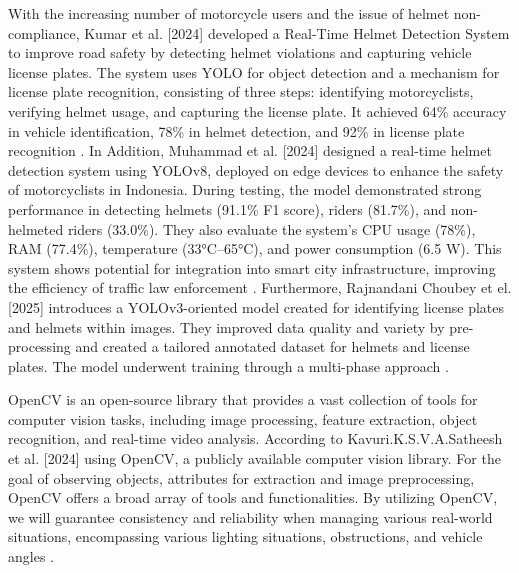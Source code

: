 \begin{refsection}
    With the increasing number of motorcycle users and the issue of helmet non-compliance, Kumar et al. [2024] developed a Real-Time Helmet Detection System to improve road safety by detecting helmet violations and capturing vehicle license plates. The system uses YOLO for object detection and a mechanism for license plate recognition, consisting of three steps: identifying motorcyclists, verifying helmet usage, and capturing the license plate. It achieved 64\% accuracy in vehicle identification, 78\% in helmet detection, and 92\% in license plate recognition \cite{kumar2024realtime}. In Addition, Muhammad et al. [2024] designed a real-time helmet detection system using YOLOv8, deployed on edge devices to enhance the safety of motorcyclists in Indonesia. During testing, the model demonstrated strong performance in detecting helmets (91.1\% F1 score), riders (81.7\%), and non-helmeted riders (33.0\%). They also evaluate the system’s CPU usage (78\%), RAM (77.4\%), temperature (33°C–65°C), and power consumption (6.5 W). This system shows potential for integration into smart city infrastructure, improving the efficiency of traffic law enforcement \cite {muhammad2024helmet}. Furthermore, Rajnandani Choubey et el. [2025] introduces a YOLOv3-oriented model created for identifying license plates and helmets within images. They improved data quality and variety by pre-processing and created a tailored annotated dataset for helmets and license plates. The model underwent training through a multi-phase approach \cite{choubey2025helmet}.

    OpenCV is an open-source library that provides a vast collection of tools for computer vision tasks, including image processing, feature extraction, object recognition, and real-time video analysis. According to Kavuri.K.S.V.A.Satheesh et al. [2024] using OpenCV, a publicly available computer vision library. For the goal of observing objects, attributes for extraction and image preprocessing, OpenCV offers a broad array of tools and functionalities. By utilizing OpenCV, we will guarantee consistency and reliability when managing various real-world situations, encompassing various lighting situations, obstructions, and vehicle angles \cite{satheesh2024automated}.


\end{refsection}
